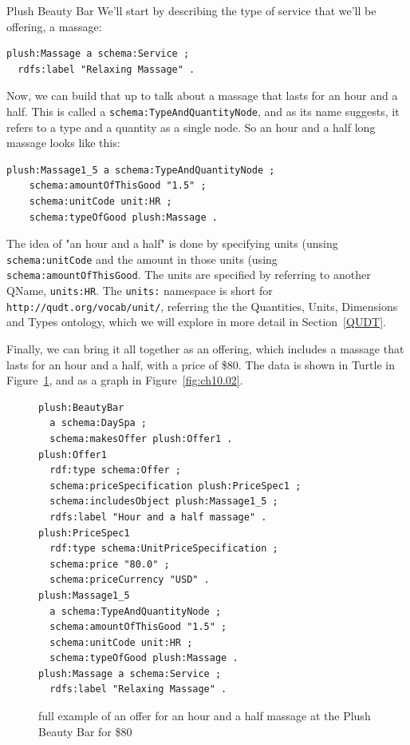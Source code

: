 \begin{example}{Plush Beauty Bar}
We'll start by describing the type of service that we'll be offering, a massage:


\begin{lstlisting}
plush:Massage a schema:Service ;
  rdfs:label "Relaxing Massage" .
\end{lstlisting}

Now, we can build that up to talk about a massage that lasts for an hour
and a half.  This is called a \texttt{schema:TypeAndQuantityNode}, and as its 
name suggests, it refers to a type and a quantity as a single node.  
So an hour and a half long  massage looks like this:

\begin{lstlisting}
plush:Massage1_5 a schema:TypeAndQuantityNode ;
    schema:amountOfThisGood "1.5" ;
    schema:unitCode unit:HR ;  
    schema:typeOfGood plush:Massage .
\end{lstlisting}

The idea of "an hour and a half" is done by specifying units (unsing \texttt{schema:unitCode} and the amount in those units (using \texttt{schema:amountOfThisGood}.  The units are specified by referring 
to another QName, \texttt{units:HR}.  The \texttt{units:} namespace
is short for \texttt{http://qudt.org/vocab/unit/}, referring the the Quantities, Units, Dimensions and Types ontology, which we will explore in more detail in 
Section~\ref{QUDT}. 

Finally, we can bring it all together as an offering, which includes a massage
that lasts for an hour and a half, with a price of \$80.  The data is shown in 
Turtle in Figure~\ref{fig:ch10.plushdata}, and as a graph in Figure~\ref{fig:ch10.02}.

\begin{figure}
\begin{lstlisting}
plush:BeautyBar
  a schema:DaySpa ;
  schema:makesOffer plush:Offer1 .
plush:Offer1
  rdf:type schema:Offer ;
  schema:priceSpecification plush:PriceSpec1 ;
  schema:includesObject plush:Massage1_5 ;
  rdfs:label "Hour and a half massage" .
plush:PriceSpec1
  rdf:type schema:UnitPriceSpecification ;
  schema:price "80.0" ;
  schema:priceCurrency "USD" .
plush:Massage1_5
  a schema:TypeAndQuantityNode ;
  schema:amountOfThisGood "1.5" ;
  schema:unitCode unit:HR ;  
  schema:typeOfGood plush:Massage .
plush:Massage a schema:Service ;
  rdfs:label "Relaxing Massage" .
\end{lstlisting}
    \caption{full example of an offer for an hour and a half massage at the Plush Beauty Bar for \$80}
    \label{fig:ch10.plushdata}
\end{figure}


\end{example}
